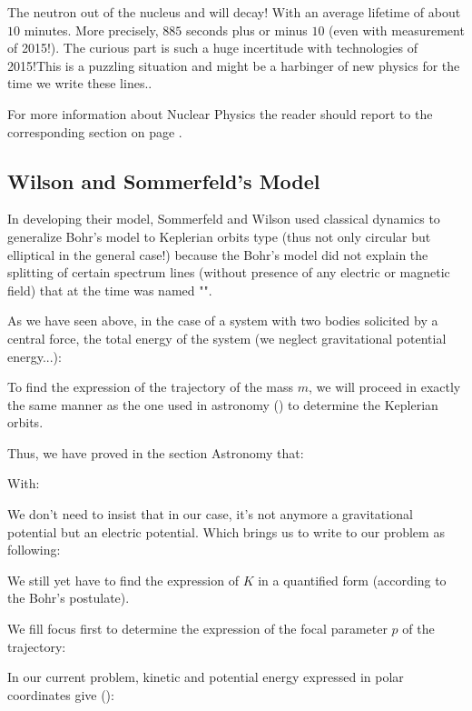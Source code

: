 	\begin{tcolorbox}[title=Remark,colframe=black,arc=10pt]
	The neutron out of the nucleus and will decay! With an average lifetime of about $10$ minutes. More precisely, $885$ seconds plus or minus $10$ (even with measurement of 2015!). The curious part is such a huge incertitude with technologies of 2015!This is a puzzling situation and might be a harbinger of new physics for the time we write these lines..
	\end{tcolorbox}	 
	
	For more information about Nuclear Physics the reader should report to the corresponding section on page \pageref{nuclear physics}.
	
	\pagebreak	
	\subsection{Wilson and Sommerfeld's Model}\label{wilson and sommerfled model}
	
	In developing their model, Sommerfeld and Wilson used classical dynamics to generalize Bohr's model to Keplerian orbits type (thus not only circular but elliptical in the general case!) because the Bohr's model did not explain the splitting of certain spectrum lines (without presence of any electric or magnetic field) that at the time was named "".
	
	As we have seen above, in the case of a system with two bodies solicited by a central force, the total energy of the system (we neglect gravitational potential energy...):
	
	To find the expression of the trajectory of the mass $m$, we will proceed in exactly the same manner as the one used in astronomy () to determine the Keplerian orbits.
	
	Thus, we have proved in the section Astronomy that:
	
	With:
	
	We don't need to insist that in our case, it's not anymore a gravitational potential but an electric potential. Which brings us to write to our problem as following:
	
	We still yet have to find the expression of $K$ in a quantified form (according to the Bohr's postulate).
	
	We fill focus first to determine the expression of the focal parameter $p$ of the trajectory:
	
	In our current problem, kinetic and potential energy expressed in polar coordinates give ():
	
